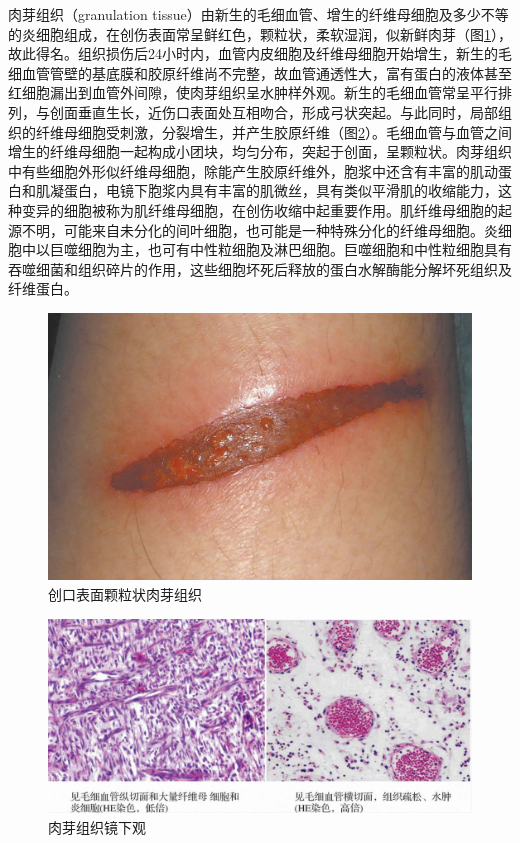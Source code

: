 肉芽组织（granulation
tissue）由新生的毛细血管、增生的纤维母细胞及多少不等的炎细胞组成，在创伤表面常呈鲜红色，颗粒状，柔软湿润，似新鲜肉芽（图\ref{fig2-3}），故此得名。组织损伤后24小时内，血管内皮细胞及纤维母细胞开始增生，新生的毛细血管管壁的基底膜和胶原纤维尚不完整，故血管通透性大，富有蛋白的液体甚至红细胞漏出到血管外间隙，使肉芽组织呈水肿样外观。新生的毛细血管常呈平行排列，与创面垂直生长，近伤口表面处互相吻合，形成弓状突起。与此同时，局部组织的纤维母细胞受刺激，分裂增生，并产生胶原纤维（图\ref{fig2-4}）。毛细血管与血管之间增生的纤维母细胞一起构成小团块，均匀分布，突起于创面，呈颗粒状。肉芽组织中有些细胞外形似纤维母细胞，除能产生胶原纤维外，胞浆中还含有丰富的肌动蛋白和肌凝蛋白，电镜下胞浆内具有丰富的肌微丝，具有类似平滑肌的收缩能力，这种变异的细胞被称为肌纤维母细胞，在创伤收缩中起重要作用。肌纤维母细胞的起源不明，可能来自未分化的间叶细胞，也可能是一种特殊分化的纤维母细胞。炎细胞中以巨噬细胞为主，也可有中性粒细胞及淋巴细胞。巨噬细胞和中性粒细胞具有吞噬细菌和组织碎片的作用，这些细胞坏死后释放的蛋白水解酶能分解坏死组织及纤维蛋白。

\begin{figure}[!h]
	\begin{center}
		\includegraphics{./images/Image00026.jpg}
	\end{center}
	\captionsetup{justification=centering}
	\caption{创口表面颗粒状肉芽组织}
	\label{fig2-3}
\end{figure}


\begin{figure}[!h]
	\begin{center}
		\includegraphics{./images/Image00027.jpg}
	\end{center}
	\captionsetup{justification=centering}
	\caption{肉芽组织镜下观}
	\label{fig2-4}
\end{figure}

